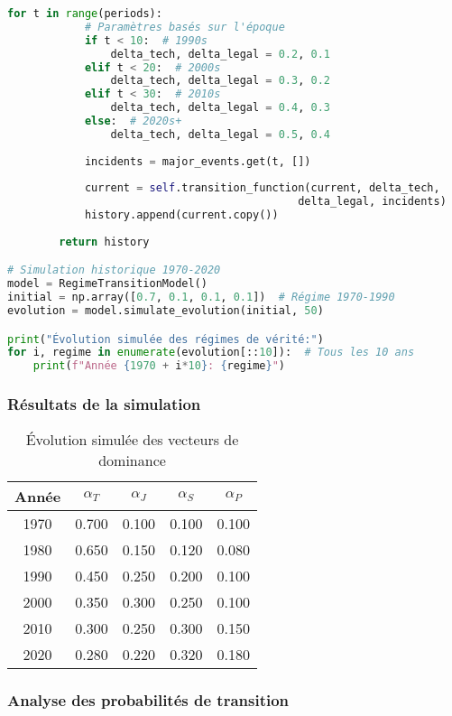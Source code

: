 \documentclass[12pt,a4paper]{article}
\begin{document}
\begin{lstlisting}[language=Python, caption=Modèle de transition des régimes]
        for t in range(periods):
            # Paramètres basés sur l'époque
            if t < 10:  # 1990s
                delta_tech, delta_legal = 0.2, 0.1
            elif t < 20:  # 2000s
                delta_tech, delta_legal = 0.3, 0.2
            elif t < 30:  # 2010s
                delta_tech, delta_legal = 0.4, 0.3
            else:  # 2020s+
                delta_tech, delta_legal = 0.5, 0.4
            
            incidents = major_events.get(t, [])
            
            current = self.transition_function(current, delta_tech, 
                                             delta_legal, incidents)
            history.append(current.copy())
        
        return history

# Simulation historique 1970-2020
model = RegimeTransitionModel()
initial = np.array([0.7, 0.1, 0.1, 0.1])  # Régime 1970-1990
evolution = model.simulate_evolution(initial, 50)

print("Évolution simulée des régimes de vérité:")
for i, regime in enumerate(evolution[::10]):  # Tous les 10 ans
    print(f"Année {1970 + i*10}: {regime}")
\end{lstlisting}

\subsubsection{Résultats de la simulation}

\begin{table}[H]
\centering
\begin{tabular}{|c|c|c|c|c|}
\hline
\textbf{Année} & $\alpha_T$ & $\alpha_J$ & $\alpha_S$ & $\alpha_P$ \\
\hline
1970 & 0.700 & 0.100 & 0.100 & 0.100 \\
1980 & 0.650 & 0.150 & 0.120 & 0.080 \\
1990 & 0.450 & 0.250 & 0.200 & 0.100 \\
2000 & 0.350 & 0.300 & 0.250 & 0.100 \\
2010 & 0.300 & 0.250 & 0.300 & 0.150 \\
2020 & 0.280 & 0.220 & 0.320 & 0.180 \\
\hline
\end{tabular}
\caption{Évolution simulée des vecteurs de dominance}
\end{table}

\subsubsection{Analyse des probabilités de transition}
\end{document}
